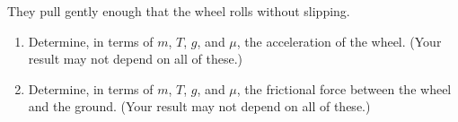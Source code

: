\documentclass[12pt]{article}
\begin{document}
\begin{enumerate}
They pull gently enough that the wheel rolls without slipping.

\begin{enumerate}
	\item Determine, in terms of $m$, $T$, $g$, and $\mu$, the acceleration of the wheel. (Your result may not depend on all of these.)
	
	\item Determine, in terms of $m$, $T$, $g$, and $\mu$, the frictional force between the wheel and the ground. (Your result may not depend on all of these.)	
\end{enumerate}

\newpage
%
%
%
%	

\end{enumerate}
\end{document}

